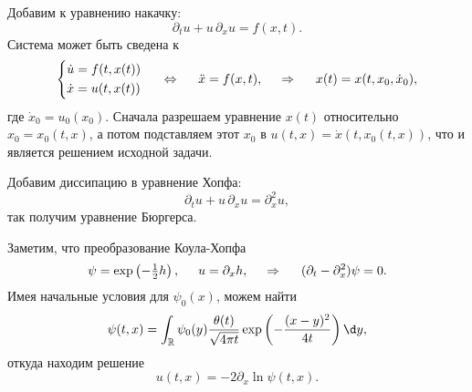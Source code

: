  Добавим к уравнению накачку:
\begin{equation*}
    \partial_t u + u\, \partial_x u = f(x, t).
\end{equation*}
Система может быть сведена к
\begin{equation*}
    \left\{\begin{aligned}
        \dot{u} &= f(t, x(t)) \\
        \dot{x} &= u(t, x(t))
    \end{aligned}\right.
    \hspace{5 mm} \Leftrightarrow \hspace{5 mm} 
    \ddot{x} = f(x, t),
    \hspace{0.5cm} \Rightarrow \hspace{0.5cm}
    x(t) = x(t, x_0, \dot{x}_0),
\end{equation*}
где $\dot{x}_0 = u_0(x_0)$. Сначала разрешаем уравнение $x(t)$ относительно $x_0 = x_0(t, x)$, а потом подставляем этот $x_0$ в $u(t, x) = \dot{x}(t, x_0(t,x))$, что и является решением исходной задачи.



Добавим диссипацию в уравнение Хопфа:
\begin{equation*}
    \partial_t u + u\, \partial_x u = \partial_x^2 u,
\end{equation*}
так получим уравнение Бюргерса.

Заметим, что преобразование Коула-Хопфа
\begin{equation*}
    \psi = \exp\left(- \tfrac{1}{2}h\right),
    \hspace{5 mm} 
    u = \partial_x h,
    \hspace{0.5cm} \Rightarrow \hspace{0.5cm}
    (\partial_t - \partial_x^2)\psi = 0.
\end{equation*}
Имея начальные условия для $\psi_0(x)$, можем найти
\begin{equation*}
    \psi(t, x) = \int_{\mathbb{R}} \psi_0 (y) \frac{\theta(t)}{\sqrt{4 \pi t}} \exp\left(-\frac{(x-y)^2}{4t}\right) \d y,
\end{equation*}
откуда находим решение
\begin{equation*}
    u(t, x) =  -2 \partial_x \ln \psi(t, x).
\end{equation*}

